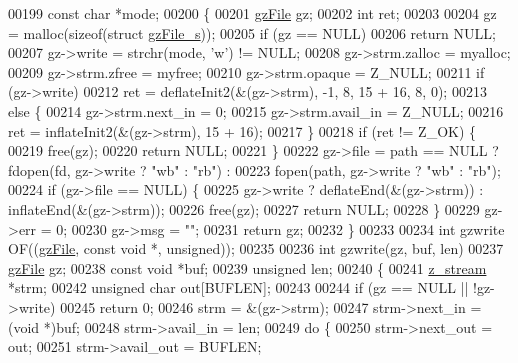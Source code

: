 \begin{DoxyCode}
{{{00199     \textcolor{keyword}{const} \textcolor{keywordtype}{char} *mode;
00200 \{
00201     \hyperlink{structgz_file__s}{gzFile} gz;
00202     \textcolor{keywordtype}{int} ret;
00203 
00204     gz = malloc(\textcolor{keyword}{sizeof}(\textcolor{keyword}{struct} \hyperlink{structgz_file__s}{gzFile\_s}));
00205     \textcolor{keywordflow}{if} (gz == NULL)
00206         \textcolor{keywordflow}{return} NULL;
00207     gz->write = strchr(mode, \textcolor{charliteral}{'w'}) != NULL;
00208     gz->strm.zalloc = myalloc;
00209     gz->strm.zfree = myfree;
00210     gz->strm.opaque = Z\_NULL;
00211     \textcolor{keywordflow}{if} (gz->write)
00212         ret = deflateInit2(&(gz->strm), -1, 8, 15 + 16, 8, 0);
00213     \textcolor{keywordflow}{else} \{
00214         gz->strm.next\_in = 0;
00215         gz->strm.avail\_in = Z\_NULL;
00216         ret = inflateInit2(&(gz->strm), 15 + 16);
00217     \}
00218     \textcolor{keywordflow}{if} (ret != Z\_OK) \{
00219         free(gz);
00220         \textcolor{keywordflow}{return} NULL;
00221     \}
00222     gz->file = path == NULL ? fdopen(fd, gz->write ? \textcolor{stringliteral}{"wb"} : \textcolor{stringliteral}{"rb"}) :
00223                               fopen(path, gz->write ? \textcolor{stringliteral}{"wb"} : \textcolor{stringliteral}{"rb"});
00224     \textcolor{keywordflow}{if} (gz->file == NULL) \{
00225         gz->write ? deflateEnd(&(gz->strm)) : inflateEnd(&(gz->strm));
00226         free(gz);
00227         \textcolor{keywordflow}{return} NULL;
00228     \}
00229     gz->err = 0;
00230     gz->msg = \textcolor{stringliteral}{""};
00231     \textcolor{keywordflow}{return} gz;
00232 \}
00233 
00234 \textcolor{keywordtype}{int} gzwrite OF((\hyperlink{structgz_file__s}{gzFile}, \textcolor{keyword}{const} \textcolor{keywordtype}{void} *, \textcolor{keywordtype}{unsigned}));
00235 
00236 \textcolor{keywordtype}{int} gzwrite(gz, buf, len)
00237     \hyperlink{structgz_file__s}{gzFile} gz;
00238     \textcolor{keyword}{const} \textcolor{keywordtype}{void} *buf;
00239     \textcolor{keywordtype}{unsigned} len;
00240 \{
00241     \hyperlink{structz__stream__s}{z\_stream} *strm;
00242     \textcolor{keywordtype}{unsigned} \textcolor{keywordtype}{char} out[BUFLEN];
00243 
00244     \textcolor{keywordflow}{if} (gz == NULL || !gz->write)
00245         \textcolor{keywordflow}{return} 0;
00246     strm = &(gz->strm);
00247     strm->next\_in = (\textcolor{keywordtype}{void} *)buf;
00248     strm->avail\_in = len;
00249     \textcolor{keywordflow}{do} \{
00250         strm->next\_out = out;
00251         strm->avail\_out = BUFLEN;
}}}
\end{DoxyCode}
